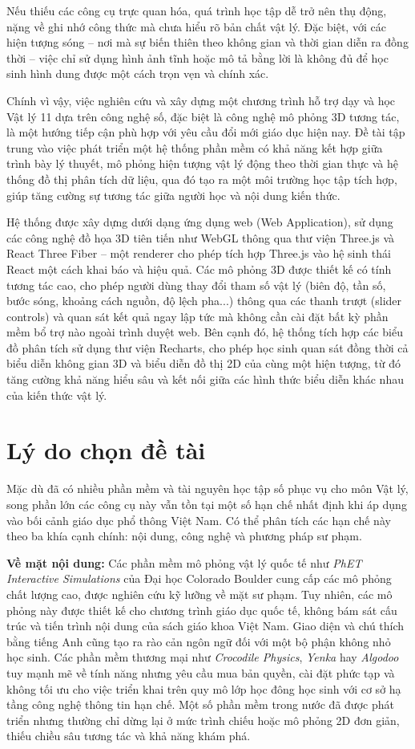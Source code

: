 Nếu thiếu các công cụ trực quan hóa, quá trình học tập dễ trở nên thụ động, nặng về ghi nhớ công thức mà chưa hiểu rõ bản chất vật lý. Đặc biệt, với các hiện tượng sóng – nơi mà sự biến thiên theo không gian và thời gian diễn ra đồng thời – việc chỉ sử dụng hình ảnh tĩnh hoặc mô tả bằng lời là không đủ để học sinh hình dung được một cách trọn vẹn và chính xác. 

Chính vì vậy, việc nghiên cứu và xây dựng một chương trình hỗ trợ dạy và học Vật lý 11 dựa trên công nghệ số, đặc biệt là công nghệ mô phỏng 3D tương tác, là một hướng tiếp cận phù hợp với yêu cầu đổi mới giáo dục hiện nay. Đề tài tập trung vào việc phát triển một hệ thống phần mềm có khả năng kết hợp giữa trình bày lý thuyết, mô phỏng hiện tượng vật lý động theo thời gian thực và hệ thống đồ thị phân tích dữ liệu, qua đó tạo ra một môi trường học tập tích hợp, giúp tăng cường sự tương tác giữa người học và nội dung kiến thức.

Hệ thống được xây dựng dưới dạng ứng dụng web (Web Application), sử dụng các công nghệ đồ họa 3D tiên tiến như WebGL thông qua thư viện Three.js và React Three Fiber – một renderer cho phép tích hợp Three.js vào hệ sinh thái React một cách khai báo và hiệu quả. Các mô phỏng 3D được thiết kế có tính tương tác cao, cho phép người dùng thay đổi tham số vật lý (biên độ, tần số, bước sóng, khoảng cách nguồn, độ lệch pha...) thông qua các thanh trượt (slider controls) và quan sát kết quả ngay lập tức mà không cần cài đặt bất kỳ phần mềm bổ trợ nào ngoài trình duyệt web. Bên cạnh đó, hệ thống tích hợp các biểu đồ phân tích sử dụng thư viện Recharts, cho phép học sinh quan sát đồng thời cả biểu diễn không gian 3D và biểu diễn đồ thị 2D của cùng một hiện tượng, từ đó tăng cường khả năng hiểu sâu và kết nối giữa các hình thức biểu diễn khác nhau của kiến thức vật lý.

\section{Lý do chọn đề tài}
Mặc dù đã có nhiều phần mềm và tài nguyên học tập số phục vụ cho môn Vật lý, song phần lớn các công cụ này vẫn tồn tại một số hạn chế nhất định khi áp dụng vào bối cảnh giáo dục phổ thông Việt Nam. Có thể phân tích các hạn chế này theo ba khía cạnh chính: nội dung, công nghệ và phương pháp sư phạm.

\textbf{Về mặt nội dung:} Các phần mềm mô phỏng vật lý quốc tế như \textit{PhET Interactive Simulations} của Đại học Colorado Boulder cung cấp các mô phỏng chất lượng cao, được nghiên cứu kỹ lưỡng về mặt sư phạm. Tuy nhiên, các mô phỏng này được thiết kế cho chương trình giáo dục quốc tế, không bám sát cấu trúc và tiến trình nội dung của sách giáo khoa Việt Nam. Giao diện và chú thích bằng tiếng Anh cũng tạo ra rào cản ngôn ngữ đối với một bộ phận không nhỏ học sinh. Các phần mềm thương mại như \textit{Crocodile Physics}, \textit{Yenka} hay \textit{Algodoo} tuy mạnh mẽ về tính năng nhưng yêu cầu mua bản quyền, cài đặt phức tạp và không tối ưu cho việc triển khai trên quy mô lớp học đông học sinh với cơ sở hạ tầng công nghệ thông tin hạn chế. Một số phần mềm trong nước đã được phát triển nhưng thường chỉ dừng lại ở mức trình chiếu hoặc mô phỏng 2D đơn giản, thiếu chiều sâu tương tác và khả năng khám phá.

